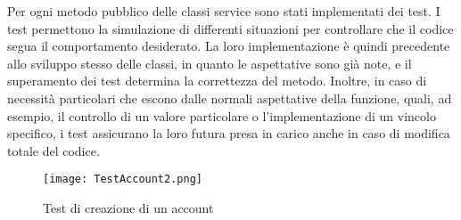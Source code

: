 Per ogni metodo pubblico delle classi service sono stati implementati dei test.
I test permettono la simulazione di differenti situazioni 
per controllare che il codice segua il comportamento desiderato.
La loro implementazione è quindi precedente allo sviluppo stesso delle classi, 
in quanto le aspettative sono già note, e il superamento dei test determina la correttezza del metodo.
Inoltre, in caso di necessità particolari che escono dalle normali aspettative della funzione, 
quali, ad esempio, il controllo di un valore particolare o l'implementazione di un vincolo specifico,
i test assicurano la loro futura presa in carico anche in caso di modifica totale del codice.\\
\begin{figure}[h!]
    \begin{center}
        \texttt{[image: TestAccount2.png]}
        \caption{Test di creazione di un account}
    \end{center}
\end{figure}

\clearpage



